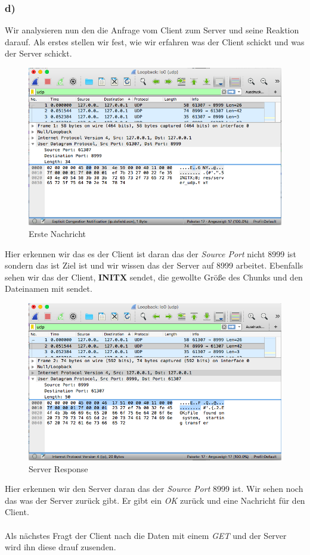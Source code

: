 \subsubsection{d)}
Wir analysieren nun den die Anfrage vom Client zum Server und seine Reaktion darauf. Als erstes stellen wir fest, wie wir erfahren was der Client schickt und was der Server schickt. 
\begin{figure}[H]
	\centering
	\includegraphics[width=0.6 \linewidth]{images/w06}
	\caption{Erste Nachricht} \label{ordner}
\end{figure} 
Hier erkennen wir das es der Client ist daran das der \textit{Source Port} nicht 8999 ist sondern das ist Ziel ist und wir wissen das der Server auf 8999 arbeitet. Ebenfalls sehen wir das der Client, \textbf{INITX} sendet, die gewollte Größe des Chunks und den Dateinamen mit sendet. 
\begin{figure}[H]
	\centering
	\includegraphics[width=0.6 \linewidth]{images/w07}
	\caption{Server Response} \label{ordner}
\end{figure} 
Hier erkennen wir den Server daran das der \textit{Source Port} 8999 ist. Wir sehen noch das was der Server zurück gibt. Er gibt ein \textit{OK} zurück und eine Nachricht für den Client.\\\\Als nächstes Fragt der Client nach die Daten mit einem \textit{GET} und der Server wird ihn diese drauf zusenden.
